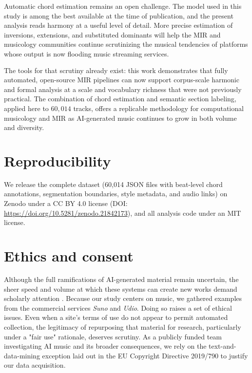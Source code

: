 \documentclass{article}
\begin{document}
Automatic chord estimation remains an open challenge. The model used in this study is among the best available at the time of publication, and the present analysis reads harmony at a useful level of detail. More precise estimation of inversions, extensions, and substituted dominants will help the MIR and musicology communities continue scrutinizing the musical tendencies of platforms whose output is now flooding music streaming services.

The tools for that scrutiny already exist: this work demonstrates that fully automated, open-source MIR pipelines can now support corpus-scale harmonic and formal analysis at a scale and vocabulary richness that were not previously practical. The combination of chord estimation and semantic section labeling, applied here to $60,014$ tracks, offers a replicable methodology for computational musicology and MIR as AI-generated music continues to grow in both volume and diversity.

\section{Reproducibility}
\label{sec:reproducibility}
We release the complete dataset (60,014 JSON files with beat-level chord annotations, segmentation boundaries, style metadata, and audio links) on Zenodo under a CC BY 4.0 license (DOI: \url{https://doi.org/10.5281/zenodo.21842173}), and all analysis code under an MIT license.

\section{Ethics and consent}

Although the full ramifications of AI-generated material remain uncertain, the sheer speed and volume at which these systems can create new works demand scholarly attention \citep{Sturm2024a,pelly2025mood}. Because our study centers on music, we gathered examples from the commercial services {\em Suno} and {\em Udio}. Doing so raises a set of ethical issues. Even when a site's terms of use do not appear to permit automated collection, the legitimacy of repurposing that material for research, particularly under a "fair use" rationale, deserves scrutiny. As a publicly funded team investigating AI music and its broader consequences, we rely on the text-and-data-mining exception laid out in the EU Copyright Directive 2019/790 \citep{EUDirective2019} to justify our data acquisition.
\end{document}
